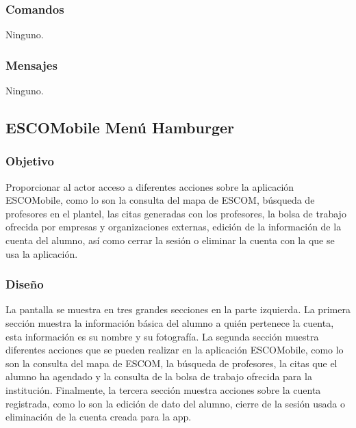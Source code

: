 \subsubsection{Comandos}
	\noindent
	Ninguno.

\subsubsection{Mensajes}
	\noindent
	Ninguno.




\subsection{ESCOMobile Menú Hamburger}

\subsubsection{Objetivo}
	\noindent
	Proporcionar al actor acceso a diferentes acciones sobre la aplicación ESCOMobile, como lo son la consulta del mapa de ESCOM, búsqueda de profesores en el plantel, las citas generadas con los profesores, la bolsa de trabajo ofrecida por empresas y organizaciones externas, edición de la información de la cuenta del alumno, así como cerrar la sesión o eliminar la cuenta con la que se usa la aplicación.

\subsubsection{Diseño}
	\noindent
	La pantalla se muestra en tres grandes secciones en la parte izquierda. La primera sección muestra la información básica del alumno a quién pertenece la cuenta, esta información es su nombre y su fotografía. La segunda sección muestra diferentes acciones que se pueden realizar en la aplicación ESCOMobile, como lo son la consulta del mapa de ESCOM, la búsqueda de profesores, la citas que el alumno ha agendado y la consulta de la bolsa de trabajo ofrecida para la institución. Finalmente, la tercera sección muestra acciones sobre la cuenta registrada, como lo son la edición de dato del alumno, cierre de la sesión usada o eliminación de la cuenta creada para la app. 

\pagebreak
{}

